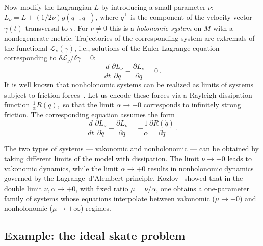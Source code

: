 \documentclass[11pt]{article}
\theoremstyle{definition}
\newcounter{ai}
\begin{document}
Now modify the Lagrangian $L$ by introducing a small parameter $\nu$:
$L_\nu=L+(1/2\nu) g(\dot q^\perp, \dot q^\perp)$, where  $\dot q^\perp$ is the component of the velocity vector $\dot \gamma(t)$ transversal to $\tau$.
For $\nu\not=0$ this is a {\it holonomic system} on $M$ with a nondegenerate metric.
Trajectories of the corresponding system are extremals of the functional $\mathcal L_\nu(\gamma)$, i.e., solutions of the Euler-Lagrange equation corresponding to $\delta \mathcal L_\nu/\delta\gamma=0$: 
$$
\frac{d}{dt}\frac{\partial L_\nu}{\partial \dot q}-\frac{\partial L_\nu}{\partial q}=0\,.
$$
It is well known that nonholonomic systems can be realized as limits of systems subject to friction forces~\cite{caratheodory1933schlitten}. 
Let us encode these forces via a Rayleigh dissipation function $
\frac{1}{\alpha} R(\dot{q}),
$
so that the limit \( \alpha \to +0 \) corresponds to infinitely strong friction.
The corresponding equation assumes the form
$$
\frac{d}{dt}\frac{\partial L_\nu}{\partial \dot q}-\frac{\partial L_\nu}{\partial q}=-\frac{1}{\alpha} \frac{\partial R(\dot{q})}{\partial \dot q}\,.
$$





The two types of systems --- vakonomic and nonholonomic --- can be obtained by taking different limits of the model with dissipation. 
The limit \( \nu \to +0 \) leads to vakonomic dynamics, while the limit \( \alpha \to +0 \) results in nonholonomic dynamics governed by the Lagrange--d'Alembert principle. 
Kozlov~\cite{kozlov1983realization} showed that in the double limit \( \nu, \alpha \to +0 \), with fixed ratio \( \mu = \nu/\alpha \), one obtains a one-parameter family of systems whose equations interpolate between vakonomic (\( \mu \to +0 \)) and nonholonomic (\( \mu \to +\infty \)) regimes.



\bigskip

\subsection{Example: the ideal skate problem}
\label{sec:skate}
\end{document}
